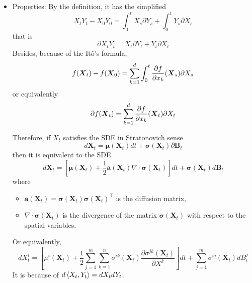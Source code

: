 \documentclass[a4paper,12pt]{article}
\begin{document}
\begin{itemize}
  \item Properties: By the definition, it has the simplified 
  \begin{equation*}
    X_tY_t - X_0Y_0 = \int_0^t X_s \partial Y_s + \int_0^tY_s \partial X_s
  \end{equation*}
  that is
  \begin{equation*}
    \partial X_tY_t = X_t \partial Y_t + Y_t \partial X_t
  \end{equation*}
  Besides, because of the It\^o's formula, 
  \begin{equation*}
    f(\boldsymbol{X}_t)- f(\boldsymbol{X}_0) = \sum_{k=1}^d\int_0^t\frac{\partial f}{\partial x_k}(\boldsymbol{X}_s) \partial X_s
  \end{equation*}
  or equivalently
  \begin{equation}
    \partial f(\boldsymbol{X}_t) =\sum_{k=1}^d \frac{\partial f}{\partial x_k}(\boldsymbol{X}_t) \partial X_t
  \end{equation}
  \begin{rmk}
    Therefore, if $X_t$ satisfies the SDE in Stratonovich sense
    \begin{equation*}
      d\boldsymbol{X}_t = \boldsymbol{\mu}(\boldsymbol{X}_t)dt + \boldsymbol{\sigma}(\boldsymbol{X}_t)\partial\boldsymbol{B}_t
    \end{equation*}
    then it is equivalent to the SDE
    \begin{equation*}
      d \boldsymbol{X}_t=\left[\boldsymbol{\mu}\left(\boldsymbol{X}_t\right)+\frac{1}{2} \boldsymbol{a}\left(\boldsymbol{X}_t\right) \nabla \cdot \boldsymbol{\sigma}\left(\boldsymbol{X}_t\right)\right] d t+\boldsymbol{\sigma}\left(\boldsymbol{X}_t\right) d \boldsymbol{B}_t
    \end{equation*}
    where
    \begin{itemize}
      \item $\boldsymbol{a}\left(\boldsymbol{X}_t\right)=\boldsymbol{\sigma}\left(\boldsymbol{X}_t\right) \boldsymbol{\sigma}\left(\boldsymbol{X}_t\right)^{\top}$ is the diffusion matrix,
      \item $\nabla \cdot \boldsymbol{\sigma}\left(\boldsymbol{X}_t\right)$ is the divergence of the matrix $\boldsymbol{\sigma}\left(\boldsymbol{X}_t\right)$ with respect to the spatial variables.
    \end{itemize}
    Or equivalently,
    \begin{equation*}
      d X_t^i=\left[\mu^i\left(\boldsymbol{X}_t\right)+\frac{1}{2} \sum_{j=1}^m \sum_{k=1}^n \sigma^{i k}\left(\boldsymbol{X}_t\right) \frac{\partial \sigma^{j k}\left(\boldsymbol{X}_t\right)}{\partial X^k}\right] d t+\sum_{j=1}^m \sigma^{i j}\left(\boldsymbol{X}_t\right) d B_t^j
    \end{equation*}
    It is because of $d \left\langle X_t,Y_t \right\rangle = dX_tdY_t$.
  \end{rmk}
\end{itemize}
\end{document}
